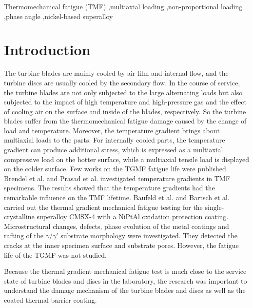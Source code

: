 \documentclass[preprint,5p,twocolumn,11pt,sort&compress]{elsarticle}
\begin{document}
\begin{frontmatter}
%
\begin{keyword}
Thermomechanical fatigue (TMF) \sep multiaxial loading \sep non-proportional loading \sep phase angle \sep nickel-based superalloy

\end{keyword}
\end{frontmatter}

\section{Introduction}
The turbine blades are mainly cooled by air film and internal flow, and the turbine discs are usually cooled by the secondary flow.
In the course of service, the turbine blades are not only subjected to the large alternating loads but also subjected to the impact of high temperature and high-pressure gas and the effect of cooling air on the surface and inside of the blades, respectively. So the turbine blades suffer from the thermomechanical fatigue damage caused by the change of load and temperature.
Moreover, the temperature gradient brings about multiaxial loads to the parts.
For internally cooled parts, the temperature gradient can produce additional stress, which is expressed as a multiaxial compressive load on the hotter surface, while a multiaxial tensile load is displayed on the colder surface.
Few works on the TGMF fatigue life were published.
Brendel et al. \cite{BRENDEL2008234} and Prasad et al. \cite{PRASAD2013131} investigated temperature gradients in TMF specimens. The results showed that the temperature gradients had the remarkable influence on the TMF lifetime.
Baufeld et al. \cite{BAUFELD2008219} and Bartsch et al. \cite{BARTSCH2008211} carried out the thermal gradient mechanical fatigue testing for the single-crystalline superalloy CMSX-4 with a NiPtAl oxidation protection coating.
Microstructural changes, defects, phase evolution of the metal coatings and rafting of the $\gamma$/$\gamma'$ substrate morphology were investigated. They detected the cracks at the inner specimen surface and substrate pores. However, the fatigue life of the TGMF was not studied.

Because the thermal gradient mechanical fatigue test is much close to the service state of turbine blades and discs in the laboratory, the research was important to understand the damage mechanism of the turbine blades and discs as well as the coated thermal barrier coating.
\end{document}
